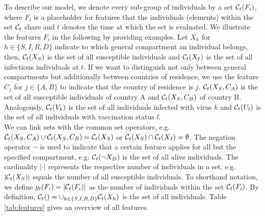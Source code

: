 To describe our model, we denote every sub-group of individuals by a set $\mathcal{C}_t(F_i)$, where $F_i$ is a placeholder for features that the individuals (elements) within the set $\mathcal{C}_t$ share and $t$ denotes the time at which the set is evaluated. We illustrate the features $F_i$ in the following by providing examples. Let $X_h$ for $h \in \{S, I, R, D \}$ indicate to which general compartment an individual belongs, then, $\mathcal{C}_t(X_S)$ is the set of all susceptible individuals and $\mathcal{C}_t(X_I)$ is the set of all infectious individuals at $t$. If we want to distinguish not only between general compartments but additionally between countries of residence, we use the feature $C_j$ for $j \in \{A, B\}$ to indicate that the country of residence is $j$. $\mathcal{C}_t(X_S, C_A)$ is the set of all susceptible individuals of country A and $\mathcal{C}_t(X_S, C_B)$ of country B. Analogously, $\mathcal{C}_t(V_k)$ is the set of all individuals infected with virus $k$ and $\mathcal{C}_t(U_l)$ is the set of all individuals with vaccination status $l$.\\

We can link sets with the common set operators, e.g. $\mathcal{C}_t(X_S, C_A) \cup \mathcal{C}_t(X_S, C_B) = \mathcal{C}_t(X_S)$ or $\mathcal{C}_t(X_S) \cap \mathcal{C}_t(X_I) = \emptyset$. The negation operator $\neg$ is used to indicate that a certain feature applies for all but the specified compartment, e.g. $\mathcal{C}_t(\neg X_D)$ is the set of all alive individuals. The cardinality $|\cdot|$ represents the respective number of individuals in a set, e.g. $|\mathcal{C}_t(X_S)|$ equals the number of all susceptible individuals. To shorthand notation, we define $y_t(F_i) = |\mathcal{C}_t(F_i)|$ as the number of individuals within the set $\mathcal{C}_t(F_i)$. By definition, $\mathcal{C}_t() = \cup_{h \in \{ S, I, R,D\}} \mathcal{C}_t(X_h)$ is the set of all individuals. Table \ref{tab:features} gives an overview of all features. \\


